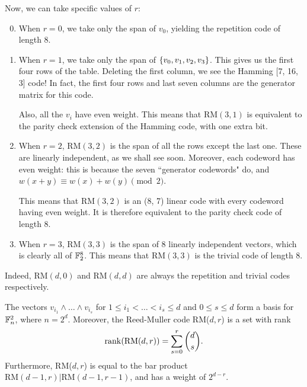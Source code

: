 \documentclass{article}
\begin{document}
Now, we can take specific values of $r$:
\begin{enumerate}
	\setcounter{enumi}{-1}
    \item When $r = 0$, we take only the span of $v_0$, yielding the repetition code of length 8.
    \item When $r = 1$, we take only the span of $\left\lbrace v_0, v_1, v_2, v_3 \right\rbrace$. This gives us the first four rows of the table. Deleting the first column, we see the Hamming [7, 16, 3] code! In fact, the first four rows and last seven columns are the generator matrix for this code.
    
    Also, all the $v_i$ have even weight. This means that $\mathrm{RM}(3, 1)$ is equivalent to the parity check extension of the Hamming code, with one extra bit.
    \item When $r = 2$, $\mathrm{RM}(3, 2)$ is the span of all the rows except the last one. These are linearly independent, as we shall see soon. Moreover, each codeword has even weight: this is because the seven ``generator codewords" do, and $w(x + y) \equiv w(x) + w(y) \pmod{2}$.
    
    This means that $\mathrm{RM}(3, 2)$ is an (8, 7) linear code with every codeword having even weight. It is therefore equivalent to the parity check code of length 8.
    \item When $r = 3$, $\mathrm{RM}(3, 3)$ is the span of 8 linearly independent vectors, which is clearly all of $\mathbb{F}_2^8$. This means that $\mathrm{RM}(3, 3)$ is the trivial code of length 8.
\end{enumerate}
Indeed, $\mathrm{RM}(d, 0)$ and $\mathrm{RM}(d, d)$ are always the repetition and trivial codes respectively.

\begin{theorem}
	\label{reed-muller-recurrence}
    The vectors $v_{i_1} \land \dots \land v_{i_s}$ for $1 \leq i_1 < \dots < i_s \leq d$ and $0 \leq s \leq d$ form a basis for $\mathbb{F}^2_n$, where $n = 2^d$. Moreover, the Reed-Muller code RM($d, r$) is a set with rank
    \[
	\operatorname{rank}(\mathrm{RM}(d, r)) = \sum_{s = 0}^r \binom{d}{s}.
	\]
	Furthermore, RM($d, r$) is equal to the bar product $\mathrm{RM}(d-1, r)|\mathrm{RM}(d-1, r-1)$, and has a weight of $2^{d-r}$.
\end{theorem}
\end{document}
